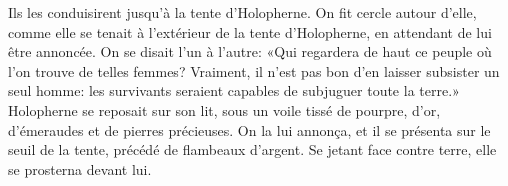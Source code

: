 Ils les conduisirent jusqu’à la tente d’Holopherne.
On fit cercle autour d’elle, comme elle se tenait à l’extérieur de la tente d’Holopherne,
	en attendant de lui être annoncée.
On se disait l’un à l’autre:
	«Qui regardera de haut ce peuple où l’on trouve de telles femmes?
Vraiment, il n’est pas bon d’en laisser subsister un seul homme:
	les survivants seraient capables de subjuguer toute la terre.»
Holopherne se reposait sur son lit,
	sous un voile tissé de pourpre, d’or, d’émeraudes et de pierres précieuses.
On la lui annonça,
	et il se présenta sur le seuil de la tente, précédé de flambeaux d’argent.
Se jetant face contre terre, elle se prosterna devant lui.
